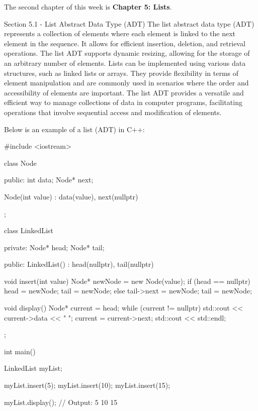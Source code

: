The second chapter of this week is \textbf{Chapter 5: Lists}.

\begin{notes}{Section 5.1 - List Abstract Data Type (ADT)}
    The list abstract data type (ADT) represents a collection of elements where each element is linked to the next element in the sequence. It allows for efficient insertion, deletion, and retrieval operations. The list ADT supports dynamic resizing, allowing for the storage of an arbitrary number 
    of elements. Lists can be implemented using various data structures, such as linked lists or arrays. They provide flexibility in terms of element manipulation and are commonly used in scenarios where the order and accessibility of elements are important. The list ADT provides a versatile and efficient 
    way to manage collections of data in computer programs, facilitating operations that involve sequential access and modification of elements.
    
    \begin{highlight}
        Below is an example of a list (ADT) in C++: 
    
    \begin{code}[C++]
    #include <iostream>

    class Node {
    public:
        int data;
        Node* next;

        Node(int value) : data(value), next(nullptr) {}
    };

    class LinkedList {
    private:
        Node* head;
        Node* tail;

    public:
        LinkedList() : head(nullptr), tail(nullptr) {}

        void insert(int value) {
            Node* newNode = new Node(value);
            if (head == nullptr) {
                head = newNode;
                tail = newNode;
            } else {
                tail->next = newNode;
                tail = newNode;
            }
        }

        void display() {
            Node* current = head;
            while (current != nullptr) {
                std::cout << current->data << " ";
                current = current->next;
            }
            std::cout << std::endl;
        }
    };

    int main() {
        LinkedList myList;

        myList.insert(5);
        myList.insert(10);
        myList.insert(15);

        myList.display();  // Output: 5 10 15

}
\end{code}
\end{highlight}
\end{notes}

